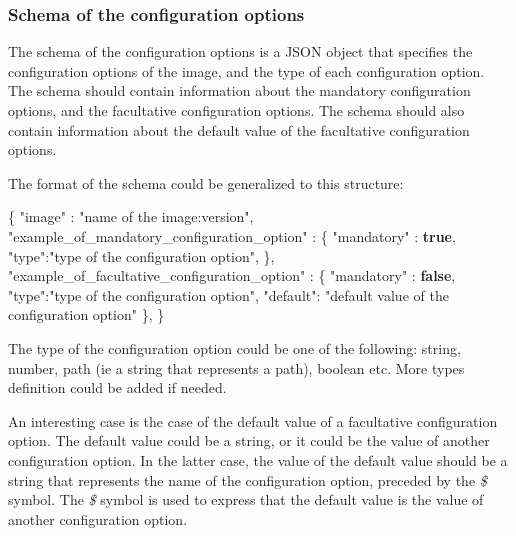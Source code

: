 \documentclass[
  11pt,
]{article}
\newenvironment{Shaded}{}{}
\newcommand{\DataTypeTok}[1]{\textcolor[rgb]{0.56,0.13,0.00}{#1}}
\newcommand{\FunctionTok}[1]{\textcolor[rgb]{0.02,0.16,0.49}{#1}}
\newcommand{\KeywordTok}[1]{\textcolor[rgb]{0.00,0.44,0.13}{\textbf{#1}}}
\newcommand{\StringTok}[1]{\textcolor[rgb]{0.25,0.44,0.63}{#1}}
\begin{document}
\hypertarget{schema-of-the-configuration-options}{%
\subsubsection{Schema of the configuration
options}\label{schema-of-the-configuration-options}}

The schema of the configuration options is a JSON object that specifies
the configuration options of the image, and the type of each
configuration option. The schema should contain information about the
mandatory configuration options, and the facultative configuration
options. The schema should also contain information about the default
value of the facultative configuration options.

\newpage

The format of the schema could be generalized to this structure:

\begin{Shaded}
\begin{Highlighting}[]
\FunctionTok{\{}
  \DataTypeTok{"image"} \FunctionTok{:} \StringTok{"name of the image:version"}\FunctionTok{,}
  \DataTypeTok{"example\_of\_mandatory\_configuration\_option"} \FunctionTok{:} \FunctionTok{\{}
    \DataTypeTok{"mandatory"} \FunctionTok{:} \KeywordTok{true}\FunctionTok{,}
    \DataTypeTok{"type"}\FunctionTok{:}\StringTok{"type of the configuration option"}\FunctionTok{,}
  \FunctionTok{\},}
  \DataTypeTok{"example\_of\_facultative\_configuration\_option"} \FunctionTok{:} \FunctionTok{\{}
    \DataTypeTok{"mandatory"} \FunctionTok{:} \KeywordTok{false}\FunctionTok{,}
    \DataTypeTok{"type"}\FunctionTok{:}\StringTok{"type of the configuration option"}\FunctionTok{,}
    \DataTypeTok{"default"}\FunctionTok{:} \StringTok{"default value of the configuration option"}
  \FunctionTok{\},}
\FunctionTok{\}}
\end{Highlighting}
\end{Shaded}

The type of the configuration option could be one of the following:
string, number, path (ie a string that represents a path), boolean etc.
More types definition could be added if needed.

An interesting case is the case of the default value of a facultative
configuration option. The default value could be a string, or it could
be the value of another configuration option. In the latter case, the
value of the default value should be a string that represents the name
of the configuration option, preceded by the \emph{\$} symbol. The
\emph{\$} symbol is used to express that the default value is the value
of another configuration option.
\end{document}
